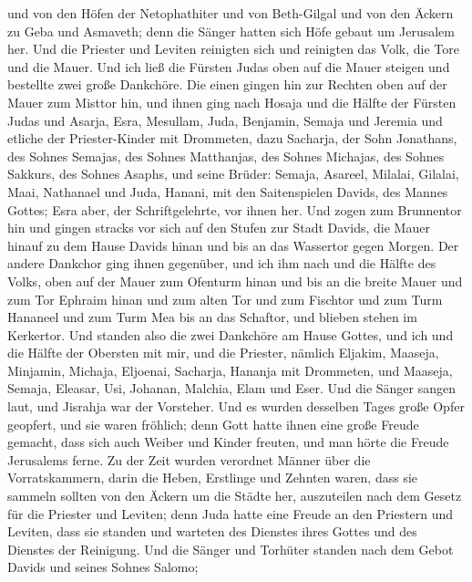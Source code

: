 und von den Höfen der Netophathiter  und von Beth-Gilgal
und von den Äckern zu Geba und Asmaveth; denn die Sänger hatten sich
Höfe gebaut um Jerusalem her.  Und die Priester und Leviten
reinigten sich und reinigten das Volk, die Tore und die Mauer.
 Und ich ließ die Fürsten Judas oben auf die Mauer steigen
und bestellte zwei große Dankchöre. Die einen gingen hin zur Rechten
oben auf der Mauer zum Misttor hin,  und ihnen ging nach
Hosaja und die Hälfte der Fürsten Judas  und Asarja, Esra,
Mesullam,  Juda, Benjamin, Semaja und Jeremia 
und etliche der Priester-Kinder mit Drommeten, dazu Sacharja, der Sohn
Jonathans, des Sohnes Semajas, des Sohnes Matthanjas, des Sohnes
Michajas, des Sohnes Sakkurs, des Sohnes Asaphs,  und seine
Brüder: Semaja, Asareel, Milalai, Gilalai, Maai, Nathanael und Juda,
Hanani, mit den Saitenspielen Davids, des Mannes Gottes; Esra aber, der
Schriftgelehrte, vor ihnen her.  Und zogen zum Brunnentor
hin und gingen stracks vor sich auf den Stufen zur Stadt Davids, die
Mauer hinauf zu dem Hause Davids hinan und bis an das Wassertor gegen
Morgen.  Der andere Dankchor ging ihnen gegenüber, und ich
ihm nach und die Hälfte des Volks, oben auf der Mauer zum Ofenturm hinan
und bis an die breite Mauer  und zum Tor Ephraim hinan und
zum alten Tor und zum Fischtor und zum Turm Hananeel und zum Turm Mea
bis an das Schaftor, und blieben stehen im Kerkertor.  Und
standen also die zwei Dankchöre am Hause Gottes, und ich und die Hälfte
der Obersten mit mir,  und die Priester, nämlich Eljakim,
Maaseja, Minjamin, Michaja, Eljoenai, Sacharja, Hananja mit Drommeten,
 und Maaseja, Semaja, Eleasar, Usi, Johanan, Malchia, Elam
und Eser. Und die Sänger sangen laut, und Jisrahja war der Vorsteher.
 Und es wurden desselben Tages große Opfer geopfert, und
sie waren fröhlich; denn Gott hatte ihnen eine große Freude gemacht,
dass sich auch Weiber und Kinder freuten, und man hörte die Freude
Jerusalems ferne.  Zu der Zeit wurden verordnet Männer über
die Vorratskammern, darin die Heben, Erstlinge und Zehnten waren, dass
sie sammeln sollten von den Äckern um die Städte her, auszuteilen nach
dem Gesetz für die Priester und Leviten; denn Juda hatte eine Freude an
den Priestern und Leviten, dass sie standen  und warteten
des Dienstes ihres Gottes und des Dienstes der Reinigung. Und die Sänger
und Torhüter standen nach dem Gebot Davids und seines Sohnes Salomo;
